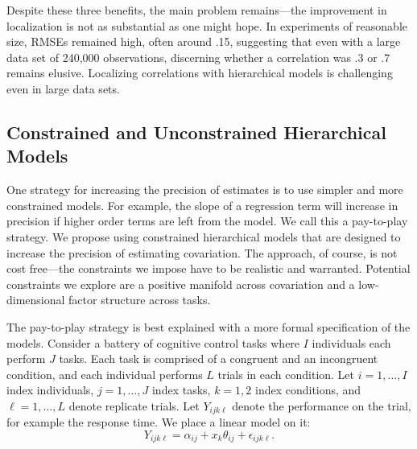 \documentclass[man, 12pt]{apa7} %
\begin{document}
Despite these three benefits, the main problem remains---the improvement in localization is not as substantial as one might hope. In experiments of reasonable size, RMSEs remained high, often around .15, suggesting that even with a large data set of 240,000 observations, discerning whether a correlation was .3 or .7 remains elusive.  Localizing correlations with hierarchical models is challenging even in large data sets.


\subsection{Constrained and Unconstrained Hierarchical Models}

One strategy for increasing the precision of estimates is to use simpler and more constrained models.  For example, the slope of a regression term will increase in precision if higher order terms are left from the model.  We call this a pay-to-play strategy.  We propose using constrained hierarchical models that are designed to increase the precision of estimating covariation.  The approach, of course, is not cost free---the constraints we impose have to be realistic and warranted.  Potential constraints we explore are a positive manifold across covariation and a low-dimensional factor structure across tasks.

The pay-to-play strategy is best explained with a more formal specification of the models.  Consider a battery of cognitive control tasks where $I$ individuals each perform $J$ tasks. Each task is comprised of a congruent and an incongruent condition, and each individual performs $L$ trials in each condition. Let $i=1,\ldots,I$ index individuals, $j=1,\ldots,J$ index tasks, $k=1,2$ index conditions, and $\ell=1,\ldots,L$ denote replicate trials. Let $Y_{ijk\ell}$ denote the performance on the trial, for example the response time.  We place a linear model on it:
\begin{equation} \label{eq:RT_surface}
Y_{ijk\ell} = \alpha_{ij} + x_k\theta_{ij} + \epsilon_{ijk\ell}.
\end{equation}
\end{document}
